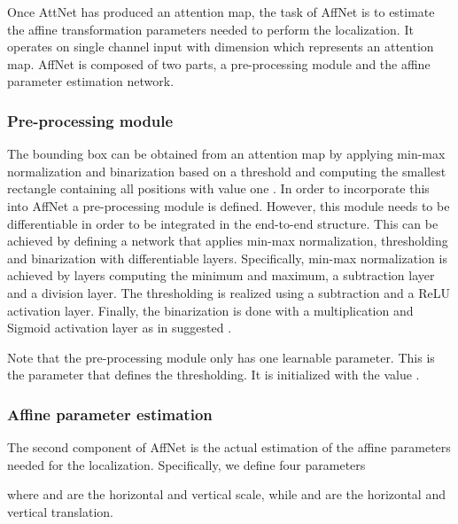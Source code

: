 \documentclass{bmvc2k}
\begin{document}
Once AttNet has produced an attention map, the task of AffNet is to estimate the affine transformation parameters  needed to perform the localization. It operates on single channel input with dimension  which represents an attention map. AffNet is composed of two parts, a pre-processing module and the affine parameter estimation network.


\subsubsection{Pre-processing module}
The bounding box can be obtained from an attention map by applying min-max normalization and binarization based on a threshold  and computing the smallest rectangle containing all positions with value one \cite{Hanselmann_2020_WACV}. In order to incorporate this into AffNet a pre-processing module is defined. However, this module needs to be differentiable in order to be integrated in the end-to-end structure. This can be achieved by defining a network that applies min-max normalization, thresholding and binarization with differentiable layers. Specifically, min-max normalization is achieved by layers computing the minimum and maximum, a subtraction layer and a division layer. The thresholding is realized using a subtraction and a ReLU activation layer. Finally, the binarization is done with a multiplication and Sigmoid activation layer as in suggested \cite{fu2017look}.



Note that the pre-processing module only has one learnable parameter. This is the parameter  that defines the thresholding. It is initialized with the value . 

\subsubsection{Affine parameter estimation}
The second component of AffNet is the actual estimation of the affine parameters  needed for the localization. Specifically, we define four parameters 

where  and  are the horizontal and vertical scale, while  and  are the horizontal and vertical translation.
\end{document}
